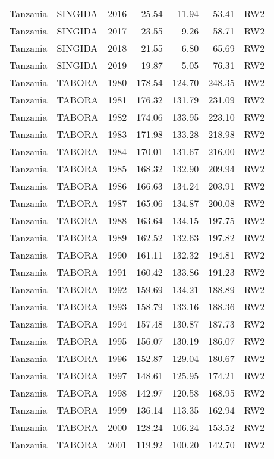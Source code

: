 \begin{longtable}{lllrrrl}
  Tanzania & SINGIDA & 2016 & 25.54 & 11.94 & 53.41 & RW2 \\ 
  Tanzania & SINGIDA & 2017 & 23.55 & 9.26 & 58.71 & RW2 \\ 
  Tanzania & SINGIDA & 2018 & 21.55 & 6.80 & 65.69 & RW2 \\ 
  Tanzania & SINGIDA & 2019 & 19.87 & 5.05 & 76.31 & RW2 \\ 
  Tanzania & TABORA & 1980 & 178.54 & 124.70 & 248.35 & RW2 \\ 
  Tanzania & TABORA & 1981 & 176.32 & 131.79 & 231.09 & RW2 \\ 
  Tanzania & TABORA & 1982 & 174.06 & 133.95 & 223.10 & RW2 \\ 
  Tanzania & TABORA & 1983 & 171.98 & 133.28 & 218.98 & RW2 \\ 
  Tanzania & TABORA & 1984 & 170.01 & 131.67 & 216.00 & RW2 \\ 
  Tanzania & TABORA & 1985 & 168.32 & 132.90 & 209.94 & RW2 \\ 
  Tanzania & TABORA & 1986 & 166.63 & 134.24 & 203.91 & RW2 \\ 
  Tanzania & TABORA & 1987 & 165.06 & 134.87 & 200.08 & RW2 \\ 
  Tanzania & TABORA & 1988 & 163.64 & 134.15 & 197.75 & RW2 \\ 
  Tanzania & TABORA & 1989 & 162.52 & 132.63 & 197.82 & RW2 \\ 
  Tanzania & TABORA & 1990 & 161.11 & 132.32 & 194.81 & RW2 \\ 
  Tanzania & TABORA & 1991 & 160.42 & 133.86 & 191.23 & RW2 \\ 
  Tanzania & TABORA & 1992 & 159.69 & 134.21 & 188.89 & RW2 \\ 
  Tanzania & TABORA & 1993 & 158.79 & 133.16 & 188.36 & RW2 \\ 
  Tanzania & TABORA & 1994 & 157.48 & 130.87 & 187.73 & RW2 \\ 
  Tanzania & TABORA & 1995 & 156.07 & 130.19 & 186.07 & RW2 \\ 
  Tanzania & TABORA & 1996 & 152.87 & 129.04 & 180.67 & RW2 \\ 
  Tanzania & TABORA & 1997 & 148.61 & 125.95 & 174.21 & RW2 \\ 
  Tanzania & TABORA & 1998 & 142.97 & 120.58 & 168.95 & RW2 \\ 
  Tanzania & TABORA & 1999 & 136.14 & 113.35 & 162.94 & RW2 \\ 
  Tanzania & TABORA & 2000 & 128.24 & 106.24 & 153.52 & RW2 \\ 
  Tanzania & TABORA & 2001 & 119.92 & 100.20 & 142.70 & RW2 \\ 

\end{longtable}
